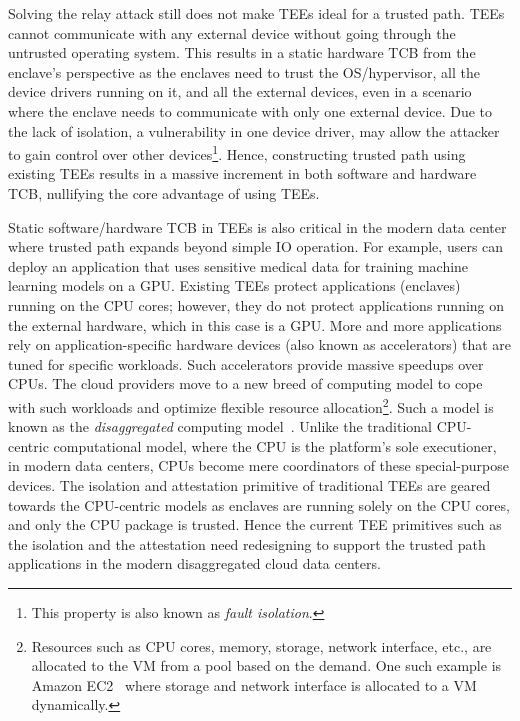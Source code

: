  Solving the relay attack still does not make TEEs ideal for a trusted path. TEEs cannot communicate with any external device without going through the untrusted operating system. This results in a static hardware TCB from the enclave's perspective as the enclaves need to trust the OS/hypervisor, all the device drivers running on it, and all the external devices, even in a scenario where the enclave needs to communicate with only one external device. Due to the lack of isolation, a vulnerability in one device driver, may allow the attacker to gain control over other devices\footnote{This property is also known as \emph{fault isolation}.}. Hence, constructing trusted path using existing TEEs results in a massive increment in both software and hardware TCB, nullifying the core advantage of using TEEs.


 Static software/hardware TCB in TEEs is also critical in the modern data center where trusted path expands beyond simple IO operation. For example, users can deploy an application that uses sensitive medical data for training machine learning models on a GPU. Existing TEEs protect applications (enclaves) running on the CPU cores; however, they do not protect applications running on the external hardware, which in this case is a GPU. More and more applications rely on application-specific hardware devices (also known as accelerators) that are tuned for specific workloads. Such accelerators provide massive speedups over CPUs. The cloud providers move to a new breed of computing model to cope with such workloads and optimize flexible resource allocation\footnote{Resources such as CPU cores, memory, storage, network interface, etc., are allocated to the VM from a pool based on the demand. One such example is Amazon EC2~\cite{ec2} where storage and network interface is allocated to a VM dynamically.}. Such a model is known as the \emph{disaggregated} computing model~\cite{disaggregatedcomp}. Unlike the traditional CPU-centric computational model, where the CPU is the platform's sole executioner, in modern data centers, CPUs become mere coordinators of these special-purpose devices. The isolation and attestation primitive of traditional TEEs are geared towards the CPU-centric models as enclaves are running solely on the CPU cores, and only the CPU package is trusted. Hence the current TEE primitives such as the isolation and the attestation need redesigning to support the trusted path applications in the modern disaggregated cloud data centers.